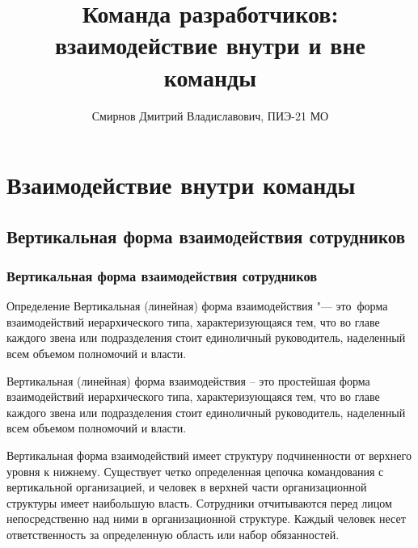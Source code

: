 \documentclass{../industrial-development}
\title{Команда разработчиков: взаимодействие внутри и вне команды}
\author{Смирнов Дмитрий Владиславович, ПИЭ-21 МО}
\date{}
\begin{document}
\begin{frame}
  \titlepage
\end{frame}


\section{Взаимодействие внутри команды}

\subsection{Вертикальная форма взаимодействия сотрудников}

\begin{frame} \frametitle{Вертикальная форма взаимодействия сотрудников}
  \begin{block}{Определение}
\alert{Вертикальная (линейная) форма взаимодействия} "--- это~форма взаимодействий иерархического типа, характеризующаяся тем, что во главе каждого звена или подразделения стоит единоличный руководитель, наделенный всем объемом полномочий и власти. 
  \end{block}
\end{frame}

\lecturenotes
Вертикальная (линейная) форма взаимодействия –  это простейшая форма взаимодействий иерархического типа, характеризующаяся тем, что во главе каждого звена или подразделения стоит единоличный руководитель, наделенный всем объемом полномочий и власти. 

 Вертикальная форма взаимодействий имеет структуру подчиненности от верхнего уровня к нижнему. Существует четко определенная цепочка командования с вертикальной организацией, и человек в верхней части организационной структуры имеет наибольшую власть. Сотрудники отчитываются перед лицом непосредственно над ними в организационной структуре. Каждый человек несет ответственность за определенную область или набор обязанностей.
\end{document}
